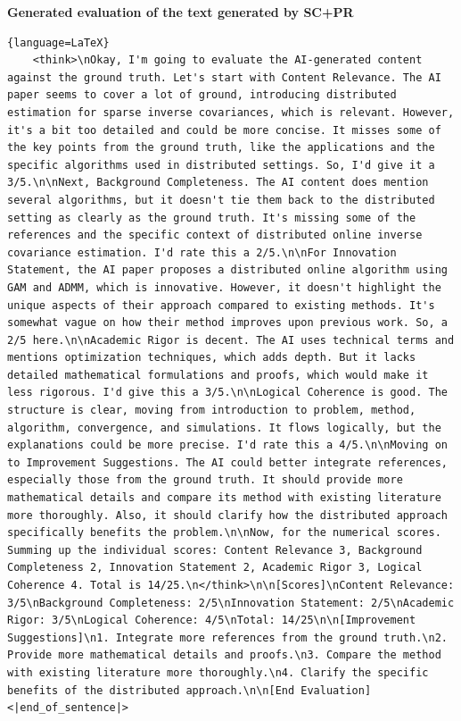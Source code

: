 \textbf{Generated evaluation of the text generated by SC+PR}
\begin{lstlisting}{language=LaTeX}
    <think>\nOkay, I'm going to evaluate the AI-generated content against the ground truth. Let's start with Content Relevance. The AI paper seems to cover a lot of ground, introducing distributed estimation for sparse inverse covariances, which is relevant. However, it's a bit too detailed and could be more concise. It misses some of the key points from the ground truth, like the applications and the specific algorithms used in distributed settings. So, I'd give it a 3/5.\n\nNext, Background Completeness. The AI content does mention several algorithms, but it doesn't tie them back to the distributed setting as clearly as the ground truth. It's missing some of the references and the specific context of distributed online inverse covariance estimation. I'd rate this a 2/5.\n\nFor Innovation Statement, the AI paper proposes a distributed online algorithm using GAM and ADMM, which is innovative. However, it doesn't highlight the unique aspects of their approach compared to existing methods. It's somewhat vague on how their method improves upon previous work. So, a 2/5 here.\n\nAcademic Rigor is decent. The AI uses technical terms and mentions optimization techniques, which adds depth. But it lacks detailed mathematical formulations and proofs, which would make it less rigorous. I'd give this a 3/5.\n\nLogical Coherence is good. The structure is clear, moving from introduction to problem, method, algorithm, convergence, and simulations. It flows logically, but the explanations could be more precise. I'd rate this a 4/5.\n\nMoving on to Improvement Suggestions. The AI could better integrate references, especially those from the ground truth. It should provide more mathematical details and compare its method with existing literature more thoroughly. Also, it should clarify how the distributed approach specifically benefits the problem.\n\nNow, for the numerical scores. Summing up the individual scores: Content Relevance 3, Background Completeness 2, Innovation Statement 2, Academic Rigor 3, Logical Coherence 4. Total is 14/25.\n</think>\n\n[Scores]\nContent Relevance: 3/5\nBackground Completeness: 2/5\nInnovation Statement: 2/5\nAcademic Rigor: 3/5\nLogical Coherence: 4/5\nTotal: 14/25\n\n[Improvement Suggestions]\n1. Integrate more references from the ground truth.\n2. Provide more mathematical details and proofs.\n3. Compare the method with existing literature more thoroughly.\n4. Clarify the specific benefits of the distributed approach.\n\n[End Evaluation]<|end_of_sentence|>
\end{lstlisting}

